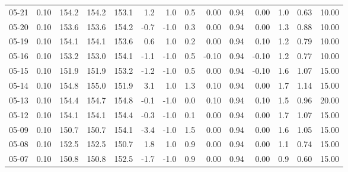 \begin{threeparttable}
{\begin{tabular}{lrrrrrrrrrrrrr}
  05-21 &     0.10 & 154.2 & 154.2 & 153.1 &        1.2 &                      1.0 &                 0.5 &       0.00 &      0.94 &           0.00 &              1.0 &            0.63 &                  10.00 \\
  05-20 &     0.10 & 153.6 & 153.6 & 154.2 &       -0.7 &                     -1.0 &                 0.3 &       0.00 &      0.94 &           0.00 &              1.3 &            0.88 &                  10.00 \\
  05-19 &     0.10 & 154.1 & 154.1 & 153.6 &        0.6 &                      1.0 &                 0.2 &       0.00 &      0.94 &           0.10 &              1.2 &            0.79 &                  10.00 \\
  05-16 &     0.10 & 153.2 & 153.0 & 154.1 &       -1.1 &                     -1.0 &                 0.5 &      -0.10 &      0.94 &          -0.10 &              1.2 &            0.77 &                  10.00 \\
  05-15 &     0.10 & 151.9 & 151.9 & 153.2 &       -1.2 &                     -1.0 &                 0.5 &       0.00 &      0.94 &          -0.10 &              1.6 &            1.07 &                  15.00 \\
  05-14 &     0.10 & 154.8 & 155.0 & 151.9 &        3.1 &                      1.0 &                 1.3 &       0.10 &      0.94 &           0.00 &              1.7 &            1.14 &                  15.00 \\
  05-13 &     0.10 & 154.4 & 154.7 & 154.8 &       -0.1 &                     -1.0 &                 0.0 &       0.10 &      0.94 &           0.10 &              1.5 &            0.96 &                  20.00 \\
  05-12 &     0.10 & 154.1 & 154.1 & 154.4 &       -0.3 &                     -1.0 &                 0.1 &       0.00 &      0.94 &           0.00 &              1.7 &            1.07 &                  15.00 \\
  05-09 &     0.10 & 150.7 & 150.7 & 154.1 &       -3.4 &                     -1.0 &                 1.5 &       0.00 &      0.94 &           0.00 &              1.6 &            1.05 &                  15.00 \\
  05-08 &     0.10 & 152.5 & 152.5 & 150.7 &        1.8 &                      1.0 &                 0.9 &       0.00 &      0.94 &           0.00 &              1.1 &            0.74 &                  15.00 \\
  05-07 &     0.10 & 150.8 & 150.8 & 152.5 &       -1.7 &                     -1.0 &                 0.9 &       0.00 &      0.94 &           0.00 &              0.9 &            0.60 &                  15.00 \\

\end{tabular}}
\end{threeparttable}
